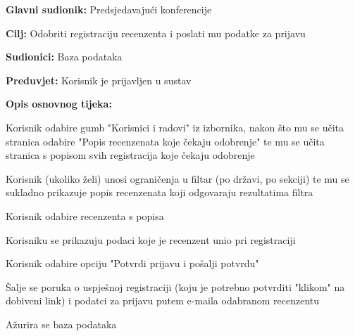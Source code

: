 					\noindent {}
					\begin{packed_item}
	
						\item \textbf{Glavni sudionik: } Predsjedavajući konferencije
						\item  \textbf{Cilj:} Odobriti registraciju recenzenta i poslati mu podatke za prijavu
						\item  \textbf{Sudionici:} Baza podataka
						\item  \textbf{Preduvjet:} Korisnik je prijavljen u sustav
						\item  \textbf{Opis osnovnog tijeka:}
						
						\item[] \begin{packed_enum}
	
							\item Korisnik odabire gumb "Korisnici i radovi" iz izbornika, nakon što mu se učita stranica odabire "Popis recenzenata koje čekaju odobrenje" te mu se učita stranica s popisom svih registracija koje čekaju odobrenje
							\item Korisnik (ukoliko želi) unosi ograničenja u filtar (po državi, po sekciji) te mu se sukladno prikazuje popis recenzenata koji odgovaraju rezultatima filtra
							\item Korisnik odabire recenzenta s popisa
							\item Korisniku se prikazuju podaci koje je recenzent unio pri registraciji
							\item Korisnik odabire opciju "Potvrdi prijavu i pošalji potvrdu"
							\item Šalje se poruka o uspješnoj registraciji (koju je potrebno potvrditi "klikom" na dobiveni link) i podatci za prijavu putem e-maila odabranom recenzentu
							\item Ažurira se baza podataka

					
						\end{packed_enum}
			
					\end{packed_item}

